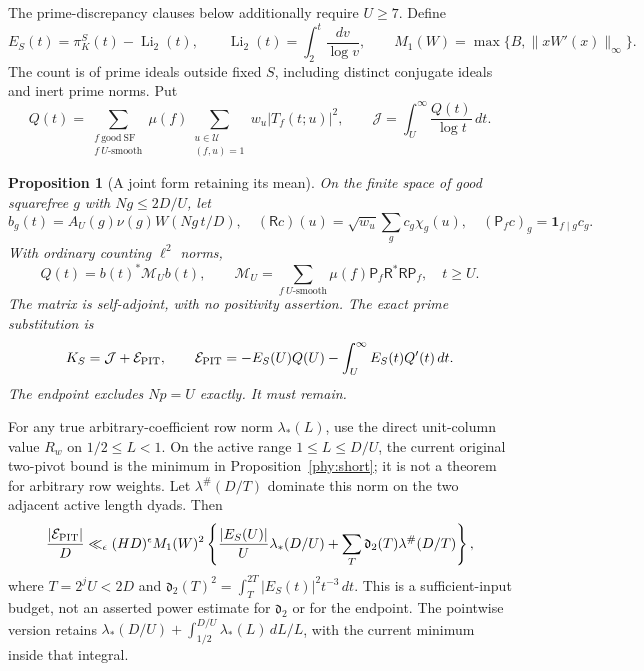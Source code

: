 \documentclass[11pt]{article}
\newtheorem{proposition}[theorem]{Proposition}
\theoremstyle{definition}\newtheorem{definition}[theorem]{Definition}
\theoremstyle{remark}\newtheorem{remark}[theorem]{Remark}
\begin{document}
The prime-discrepancy clauses below additionally require $U\ge7$.
Define
\[
 E_S(t)=\pi_K^S(t)-\operatorname{Li}_2(t),\qquad
 \operatorname{Li}_2(t)=\int_2^t\frac{dv}{\log v},\qquad
 M_1(W)=\max\{B,\|xW'(x)\|_\infty\}.
\]
The count is of prime ideals outside fixed $S$, including distinct
conjugate ideals and inert prime norms. Put
\[
 Q(t)=\sum_{\substack{f\ \mathrm{good\ SF}\\f\ U\text{-smooth}}}
       \mu(f)\sum_{\substack{u\in\mathcal U\\(f,u)=1}}
                   w_u|T_f(t;u)|^2,
 \qquad
 \mathcal J=\int_U^\infty\frac{Q(t)}{\log t}\,dt.
\]

\begin{proposition}[A joint form retaining its mean]\label{cmr:joint}
On the finite space of good squarefree $g$ with $Ng\le2D/U$, let
\[
 b_g(t)=A_U(g)\nu(g)W(Ng\,t/D),\quad
 (\mathsf Rc)(u)=\sqrt{w_u}\sum_g c_g\chi_g(u),\quad
 (\mathsf P_fc)_g=\mathbf1_{f\mid g}c_g.
\]
With ordinary counting $\ell^2$ norms,
\begin{equation}\label{cmr:joint-form}
 Q(t)=b(t)^*\mathcal M_Ub(t),\qquad
 \mathcal M_U=\sum_{f\ U\text{-smooth}}\mu(f)
                \mathsf P_f\mathsf R^*\mathsf R\mathsf P_f,
 \quad t\ge U.
\end{equation}
The matrix is self-adjoint, with no positivity assertion. The exact
prime substitution is
\begin{equation}\label{cmr:primeerror}
 K_S=\mathcal J+\mathcal E_{\rm PIT},\qquad
 \mathcal E_{\rm PIT}=-E_S(U)Q(U)
                      -\int_U^\infty E_S(t)Q'(t)\,dt.
\end{equation}
The endpoint excludes $Np=U$ exactly. It must remain.
\end{proposition}

For any true arbitrary-coefficient row norm $\lambda_*(L)$, use the
direct unit-column value $R_w$ on $1/2\le L<1$. On the active range
$1\le L\le D/U$, the current original two-pivot bound is the
minimum in Proposition~\ref{phy:short};
it is not a theorem for arbitrary row weights. Let $\lambda^\#(D/T)$
dominate this norm on the two adjacent active length dyads. Then
\begin{equation}\label{cmr:square-budget}
 \frac{|\mathcal E_{\rm PIT}|}D
 \ll_\epsilon(HD)^\epsilon M_1(W)^2
 \left\{\frac{|E_S(U)|}{U}\lambda_*(D/U)
          +\sum_T\mathfrak d_2(T)\lambda^\#(D/T)\right\},
\end{equation}
where $T=2^jU<2D$ and
$\mathfrak d_2(T)^2=\int_T^{2T}|E_S(t)|^2t^{-3}\,dt$.
This is a sufficient-input budget, not an asserted power estimate for
$\mathfrak d_2$ or for the endpoint. The pointwise version retains
$\lambda_*(D/U)+\int_{1/2}^{D/U}\lambda_*(L)\,dL/L$,
with the current minimum inside that integral.
\end{document}
